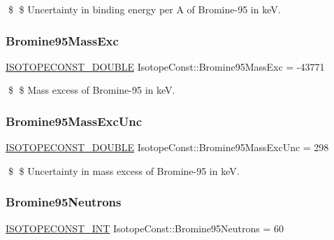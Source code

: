 \$ \$ Uncertainty in binding energy per A of Bromine-\/95 in keV. \mbox{\label{group___isotope_const-_bromine-_br95_gaea5a98582f5bdaa2d9ed432c5f55417f}} 
\subsubsection{\texorpdfstring{Bromine95\+Mass\+Exc}{Bromine95MassExc}}
{\footnotesize\ttfamily \mbox{\hyperlink{group___isotope_const-_macros_ga8f45a7272ce02c0b4c65c44636ed719a}{I\+S\+O\+T\+O\+P\+E\+C\+O\+N\+S\+T\+\_\+\+D\+O\+U\+B\+LE}} Isotope\+Const\+::\+Bromine95\+Mass\+Exc = -\/43771}

\$ \$ Mass excess of Bromine-\/95 in keV. \mbox{\label{group___isotope_const-_bromine-_br95_ga787d770bdb2f7b09a476cc9b8eea05ee}} 
\subsubsection{\texorpdfstring{Bromine95\+Mass\+Exc\+Unc}{Bromine95MassExcUnc}}
{\footnotesize\ttfamily \mbox{\hyperlink{group___isotope_const-_macros_ga8f45a7272ce02c0b4c65c44636ed719a}{I\+S\+O\+T\+O\+P\+E\+C\+O\+N\+S\+T\+\_\+\+D\+O\+U\+B\+LE}} Isotope\+Const\+::\+Bromine95\+Mass\+Exc\+Unc = 298}

\$ \$ Uncertainty in mass excess of Bromine-\/95 in keV. \mbox{\label{group___isotope_const-_bromine-_br95_ga494e669a40d9e7c6d89894f8b236f3cc}} 
\subsubsection{\texorpdfstring{Bromine95\+Neutrons}{Bromine95Neutrons}}
{\footnotesize\ttfamily \mbox{\hyperlink{group___isotope_const-_macros_ga5f18360b3e99483a35c32d789e62621c}{I\+S\+O\+T\+O\+P\+E\+C\+O\+N\+S\+T\+\_\+\+I\+NT}} Isotope\+Const\+::\+Bromine95\+Neutrons = 60}

